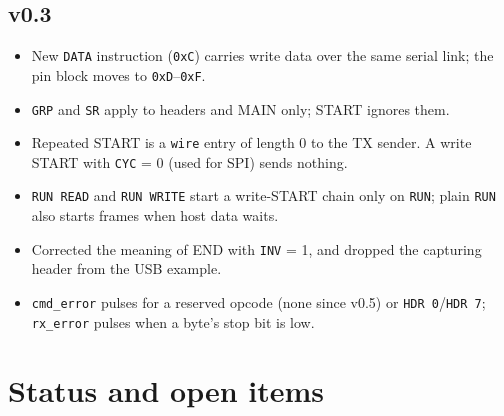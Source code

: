 \documentclass[11pt,a4paper]{article}
\newcommand{\sig}[1]{\texttt{#1}}
\begin{document}
\subsection{v0.3}

\begin{itemize}
\item New \sig{DATA} instruction (\texttt{0xC}) carries write data over the same serial link; the pin block moves to \texttt{0xD}--\texttt{0xF}.
\item \sig{GRP} and \sig{SR} apply to headers and MAIN only; START ignores them.
\item Repeated START is a \sig{wire} entry of length 0 to the TX sender. A write START with \sig{CYC} = 0 (used for SPI) sends nothing.
\item \sig{RUN READ} and \sig{RUN WRITE} start a write-START chain only on \sig{RUN}; plain \sig{RUN} also starts frames when host data waits.
\item Corrected the meaning of END with \sig{INV} = 1, and dropped the capturing header from the USB example.
\item \sig{cmd\_error} pulses for a reserved opcode (none since v0.5) or \sig{HDR 0}/\sig{HDR 7}; \sig{rx\_error} pulses when a byte's stop bit is low.
\end{itemize}

\section{Status and open items}
\end{document}
